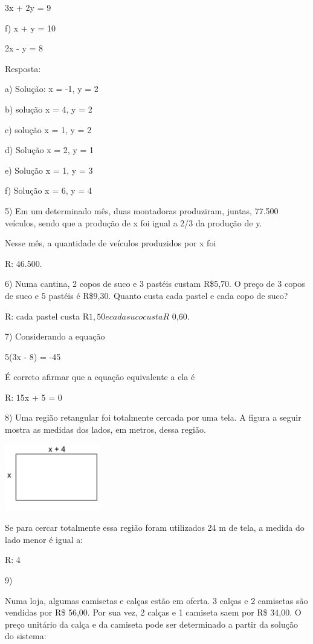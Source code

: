 3x + 2y = 9

f) x + y = 10

2x - y = 8

Resposta:

a) Solução: x = -1, y = 2

b) solução x = 4, y = 2

c) solução x = 1, y = 2

d) Solução x = 2, y = 1

e) Solução x = 1, y = 3

f) Solução x = 6, y = 4

5) Em um determinado mês, duas montadoras produziram, juntas, 77.500
veículos, sendo que a produção de x foi igual a 2/3 da produção de y.

Nesse mês, a quantidade de veículos produzidos por x foi

R: 46.500.

6) Numa cantina, 2 copos de suco e 3 pastéis custam R\$5,70. O preço de
3 copos de suco e 5 pastéis é R\$9,30. Quanto custa cada pastel e cada
copo de suco?

R: cada pastel custa R\(1,50 e cada suco custa R\) 0,60.

7) Considerando a equação

5(3x - 8) = -45

É correto afirmar que a equação equivalente a ela é

R: 15x + 5 = 0

8) Uma região retangular foi totalmente cercada por uma tela. A figura a
seguir mostra as medidas dos lados, em metros, dessa região.

\includegraphics[width=1.65625in,height=1.14583in]{./imgSAEB_6_MAT/media/image38.png}

Se para cercar totalmente essa região foram utilizados 24 m de tela, a
medida do lado menor é igual a:

R: 4

9)

Numa loja, algumas camisetas e calças estão em oferta. 3 calças e 2
camisetas são vendidas por R\$ 56,00. Por sua vez, 2 calças e 1 camiseta
saem por R\$ 34,00. O preço unitário da calça e da camiseta pode ser
determinado a partir da solução do sistema:

